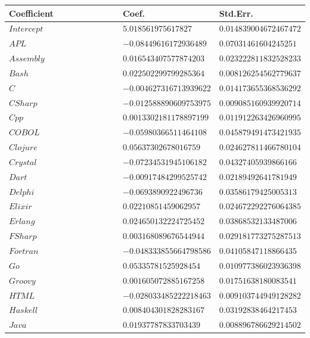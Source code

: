 \documentclass{report}
\begin{document}
\begin{longtable}{|R{0.4\linewidth}|R{0.3\linewidth}|R{0.3\linewidth}|}
  \hline
  \textbf{Coefficient} & \textbf{Coef.} & \textbf{Std.Err.} \\

  \hline
  $Intercept$ & $5.018561975617827$ & $0.014839004672467472$\\
  \hline
  $APL$ & $-0.08449616172936489$ & $0.07031461604245251$\\
  \hline
  $Assembly$ & $0.016543407577874203$ & $0.023222811832528233$\\
  \hline
  $Bash$ & $0.022502299799285364$ & $0.008126254562779637$\\
  \hline
  $C$ & $-0.004627316713939622$ & $0.014173655368536292$\\
  \hline
  $CSharp$ & $-0.012588890609753975$ & $0.009085160939920714$\\
  \hline
  $Cpp$ & $0.0013302181178897199$ & $0.011912263426960995$\\
  \hline
  $COBOL$ & $-0.05980366511464108$ & $0.045879491473421935$\\
  \hline
  $Clojure$ & $0.05637302678016759$ & $0.024627811466780104$\\
  \hline
  $Crystal$ & $-0.07234531945106182$ & $0.04327405939866166$\\
  \hline
  $Dart$ & $-0.00917484299525742$ & $0.02189492641781949$\\
  \hline
  $Delphi$ & $-0.0693890922496736$ & $0.03586179425005313$\\
  \hline
  $Elixir$ & $0.02210851459062957$ & $0.024672292276064385$\\
  \hline
  $Erlang$ & $0.024650132224725452$ & $0.03868532133487006$\\
  \hline
  $FSharp$ & $0.003168089676544944$ & $0.029181773275287513$\\
  \hline
  $Fortran$ & $-0.048333855664798586$ & $0.04105847118866435$\\
  \hline
  $Go$ & $0.05335781525928454$ & $0.010977386023936398$\\
  \hline
  $Groovy$ & $0.001605072885167258$ & $0.01751638180083541$\\
  \hline
  $HTML$ & $-0.028033485222218463$ & $0.009103744949128282$\\
  \hline
  $Haskell$ & $0.008404301828283167$ & $0.03192838464217453$\\
  \hline
  $Java$ & $0.01937787833703439$ & $0.008896786629214502$\\
  \hline

\end{longtable}
\end{document}
